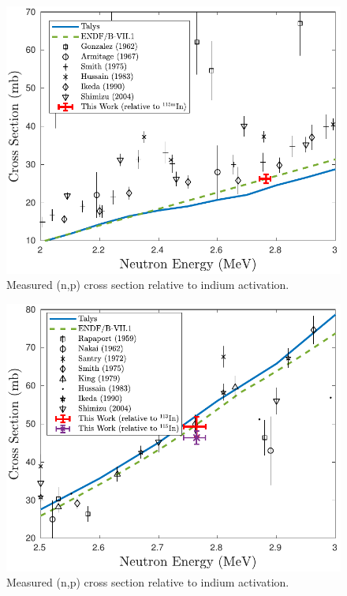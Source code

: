 \begin{figure}
 \centering
 \includegraphics[scale=0.65]{./figures/47sc_fixed_1point.pdf}
 \caption{Measured (n,p) cross section relative to indium activation.}
 \label{fig:sc_xs}
\end{figure}



\begin{figure}
 \centering
 \includegraphics[scale=0.65]{./figures/64cu_fixed_1point.pdf}
 \caption{Measured (n,p) cross section relative to indium activation.}
 \label{fig:cu_xs_zoom}
\end{figure}


